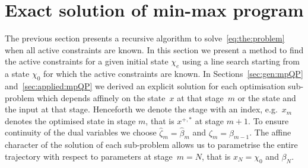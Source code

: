 \documentclass{ifacconf}
\begin{document}
\section{Exact solution of min-max program}\label{sec:line:search}
The previous section presents a recursive algorithm to solve~\eqref{eq:the:problem}
when all active constraints are known. In this section we present a method to find the active
constraints for a given initial state $\chi_e$ using a line search starting from a state $\chi_0$
for which the active constraints are known. In Sections~\ref{sec:gen:mpQP} and~\ref{sec:applied:mpQP}
we derived an explicit solution for each optimisation sub-problem which depends affinely on the
state~$x$ at that stage~$m$ or the state and the input at that stage. Henceforth we denote the stage 
with an index, e.g.~$x_m$ denotes the optimised state in stage $m$, that is $x^{+,\ast}$ at stage $m+1$.
To ensure continuity of the dual variables we choose $\hat\zeta_m = \hat\beta_m$ and $\zeta_m=\beta_{m-1}$.
The affine character of the solution of each sub-problem allows us to parametrise the entire trajectory
with respect to parameters at stage~$m=N$, that is $x_N=\chi_0$ and $\beta_N$.
\end{document}

